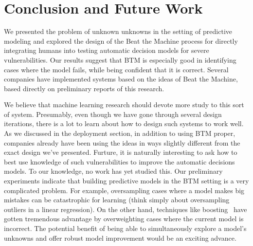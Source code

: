 \section{Conclusion and Future Work}
\label{sec:conclusion}


We presented the problem of unknown unknowns in the setting of predictive modeling and explored the design of the Beat the Machine process for directly integrating humans into testing automatic decision models for severe vulnerabilities. Our results suggest that BTM is especially good in identifying cases where the model fails, while being confident that it is correct.   Several companies have implemented systems based on the ideas of Beat the Machine, based directly on preliminary reports of this research.


We believe that machine learning research should devote more study to this sort of system.  Presumably, even though we have gone through several design iterations, there is a lot to learn about how to design such systems to work well.  As we discussed in the deployment section, in addition to using BTM proper, companies already have been using the ideas in ways slightly different from the exact design we've presented. 
Furture, it is naturally interesting to ask how to best use knowledge of such vulnerabilities to improve the automatic decisions models.  To our knowledge, no work has yet studied this.  Our preliminary experiments indicate that building predictive models in the BTM setting is a very complicated problem. For example, oversampling cases where a model makes big mistakes can be catastrophic for  learning (think simply about oversampling outliers in a linear regression). On the other hand, techniques like boosting~\cite{Freund99ashort} have gotten tremendous advantage by overweighting cases where the current model is incorrect. The potential benefit of being able to simultaneously explore a model's unknowns and offer robust model improvement would be an exciting advance.







